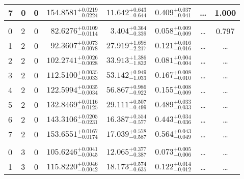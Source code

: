 \begin{table*}[!]
\begin{tabular}{llcrrlrc}
7 & 0 & 0 & $    154.8581_{-      0.0224}^{+      0.0219}$ & $      11.642_{-       0.644}^{+       0.643}$ & $       0.409_{-       0.041}^{+       0.037}$ & \multicolumn{1}{c}{\dots} & 1.000\\[1pt]
\hline \\[-8pt]
0 & 2 & 0 & $     82.6276_{-      0.0114}^{+      0.0109}$ & $       3.404_{-       0.339}^{+       0.364}$ & $       0.058_{-       0.009}^{+       0.009}$ & \multicolumn{1}{c}{\dots} & 0.797\\[1pt]
1 & 2 & 0 & $     92.3607_{-      0.0078}^{+      0.0073}$ & $      27.919_{-       2.217}^{+       1.698}$ & $       0.121_{-       0.016}^{+       0.016}$ & \multicolumn{1}{c}{\dots} & \dots \\[1pt]
2 & 2 & 0 & $    102.2741_{-      0.0028}^{+      0.0026}$ & $      33.913_{-       1.832}^{+       1.386}$ & $       0.081_{-       0.004}^{+       0.004}$ & \multicolumn{1}{c}{\dots} & \dots \\[1pt]
3 & 2 & 0 & $    112.5100_{-      0.0033}^{+      0.0035}$ & $      53.142_{-       1.033}^{+       0.949}$ & $       0.167_{-       0.010}^{+       0.008}$ & \multicolumn{1}{c}{\dots} & \dots \\[1pt]
4 & 2 & 0 & $    122.5994_{-      0.0034}^{+      0.0035}$ & $      56.867_{-       0.922}^{+       0.986}$ & $       0.155_{-       0.009}^{+       0.008}$ & \multicolumn{1}{c}{\dots} & \dots \\[1pt]
5 & 2 & 0 & $    132.8469_{-      0.0125}^{+      0.0116}$ & $      29.111_{-       0.499}^{+       0.507}$ & $       0.489_{-       0.033}^{+       0.033}$ & \multicolumn{1}{c}{\dots} & \dots \\[1pt]
6 & 2 & 0 & $    143.3106_{-      0.0231}^{+      0.0205}$ & $      16.387_{-       0.577}^{+       0.554}$ & $       0.443_{-       0.036}^{+       0.034}$ & \multicolumn{1}{c}{\dots} & \dots \\[1pt]
7 & 2 & 0 & $    153.6551_{-      0.0174}^{+      0.0167}$ & $      17.039_{-       0.587}^{+       0.578}$ & $       0.564_{-       0.049}^{+       0.043}$ & \multicolumn{1}{c}{\dots} & \dots \\[1pt]
\hline \\[-8pt]
0 & 3 & 0 & $    105.6246_{-      0.0045}^{+      0.0041}$ & $      12.065_{-       0.387}^{+       0.377}$ & $       0.073_{-       0.006}^{+       0.005}$ & \multicolumn{1}{c}{\dots} & \dots \\[1pt]
1 & 3 & 0 & $    115.8220_{-      0.0042}^{+      0.0046}$ & $      18.173_{-       0.635}^{+       0.574}$ & $       0.122_{-       0.012}^{+       0.014}$ & \multicolumn{1}{c}{\dots} & \dots \\[1pt]

\end{tabular}
\end{table*}
